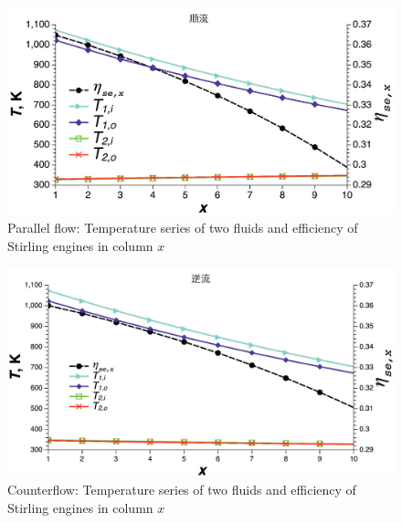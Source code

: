 
\noindent \begin{figure}[htbp]
\begin{center}
	\includegraphics[width = 0.8\columnwidth, angle = 0]{fig/Parallelflow}
	\caption{Parallel flow: Temperature series of two fluids and efficiency of Stirling engines in column $x$}
	\label{fig:Parallelflow}
\end{center}
\end{figure}
\noindent \begin{figure}[H]
\begin{center}
	\includegraphics[width = 0.8\columnwidth, angle = 0]{fig/Counterflow}
	\caption{Counterflow: Temperature series of two fluids and efficiency of Stirling engines in column $x$}
	\label{fig:Counterflow}
\end{center}
\end{figure}

